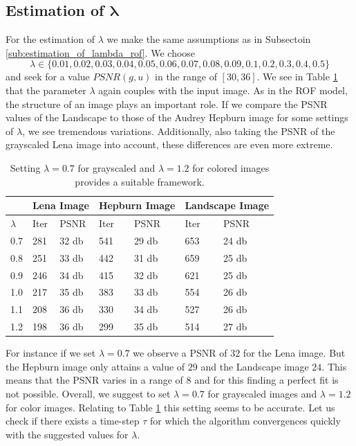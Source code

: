 \documentclass[abstracton]{scrreprt}
\begin{document}
        \subsection{Estimation of $\boldsymbol{\lambda}$} %
        \label{sub:estimation_of_lambda_tvl1}
            For the estimation of $\lambda$ we make the same assumptions as in Subsectoin \ref{sub:estimation_of_lambda_rof}. We choose
                $$
                    \lambda \in \{ 0.01, 0.02, 0.03, 0.04, 0.05, 0.06, 0.07, 0.08, 0.09, 0.1, 0.2, 0.3, 0.4, 0.5 \}
                $$
            and seek for a value $PSNR(g, u)$ in the range of $[30, 36]$. We see in Table \ref{tab:estimation_of_lambda_tvl1} that the parameter $\lambda$ again couples with the input image. As in the ROF model, the structure of an image plays an important role. If we compare the PSNR values of the Landscape to those of the Audrey Hepburn image for some settings of $\lambda$, we see tremendous variations. Additionally, also taking the PSNR of the grayscaled Lena image into account, these differences are even more extreme.
            \begin{table}[!ht]
                \centering
                \begin{tabular}{| l | l | l | l | l | l | l |}
                    \hline
                    & \multicolumn{2}{|c|}{Lena Image} & \multicolumn{2}{|c|}{Hepburn Image} & \multicolumn{2}{|c|}{Landscape Image} \\ \hline\hline
                    $\lambda$ & Iter & PSNR & Iter & PSNR & Iter & PSNR \\ \hline
                    0.7 & 281 & 32 db & 541 & 29 db & 653 & 24 db \\ \hline
                    0.8 & 251 & 33 db & 442 & 31 db & 659 & 25 db \\ \hline
                    0.9 & 246 & 34 db & 415 & 32 db & 621 & 25 db \\ \hline
                    1.0 & 217 & 35 db & 383 & 33 db & 554 & 26 db \\ \hline
                    1.1 & 208 & 36 db & 330 & 34 db & 527 & 26 db \\ \hline
                    1.2 & 198 & 36 db & 299 & 35 db & 514 & 27 db \\ \hline
                \end{tabular}
                \caption[Best estimate of $\lambda$ for the TVL1 model.]{Setting $\lambda = 0.7$ for grayscaled and $\lambda = 1.2$ for colored images provides a suitable framework.}
                \label{tab:estimation_of_lambda_tvl1}
            \end{table}
            For instance if we set $\lambda = 0.7$ we observe a PSNR of $32$ for the Lena image. But the Hepburn image only attains a value of $29$ and the Landscape image $24$. This means that the PSNR varies in a range of $8$ and for this finding a perfect fit is not possible. Overall, we suggest to set $\lambda = 0.7$ for grayscaled images and $\lambda = 1.2$ for color images. Relating to Table \ref{tab:estimation_of_lambda_tvl1} this setting seems to be accurate. Let us check if there exists a time-step $\tau$ for which the algorithm convergences quickly with the suggested values for $\lambda$.
\end{document}
